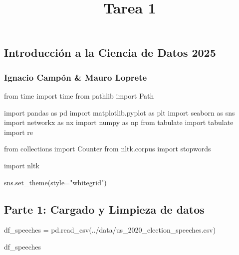 \documentclass[
  letterpaper,
  DIV=11,
  numbers=noendperiod]{scrartcl}
\title{Tarea 1}
\author{}
\date{}
\newenvironment{Shaded}{\begin{snugshade}}{\end{snugshade}}
\newcommand{\ImportTok}[1]{\textcolor[rgb]{0.00,0.46,0.62}{#1}}
\newcommand{\NormalTok}[1]{\textcolor[rgb]{0.00,0.23,0.31}{#1}}
\newcommand{\OperatorTok}[1]{\textcolor[rgb]{0.37,0.37,0.37}{#1}}
\newcommand{\StringTok}[1]{\textcolor[rgb]{0.13,0.47,0.30}{#1}}
\begin{document}
\maketitle


\subsection{Introducción a la Ciencia de Datos
2025}\label{introducciuxf3n-a-la-ciencia-de-datos-2025}

\subsubsection{Ignacio Campón \& Mauro
Loprete}\label{ignacio-campuxf3n-mauro-loprete}

\begin{Shaded}
\begin{Highlighting}[]
\ImportTok{from}\NormalTok{ time }\ImportTok{import}\NormalTok{ time}
\ImportTok{from}\NormalTok{ pathlib }\ImportTok{import}\NormalTok{ Path}

\ImportTok{import}\NormalTok{ pandas }\ImportTok{as}\NormalTok{ pd}
\ImportTok{import}\NormalTok{ matplotlib.pyplot }\ImportTok{as}\NormalTok{ plt}
\ImportTok{import}\NormalTok{ seaborn }\ImportTok{as}\NormalTok{ sns}
\ImportTok{import}\NormalTok{ networkx }\ImportTok{as}\NormalTok{ nx}
\ImportTok{import}\NormalTok{ numpy }\ImportTok{as}\NormalTok{ np}
\ImportTok{from}\NormalTok{ tabulate }\ImportTok{import}\NormalTok{ tabulate}
\ImportTok{import}\NormalTok{ re}

\ImportTok{from}\NormalTok{ collections }\ImportTok{import}\NormalTok{ Counter}
\ImportTok{from}\NormalTok{ nltk.corpus }\ImportTok{import}\NormalTok{ stopwords}

\ImportTok{import}\NormalTok{ nltk}

\NormalTok{sns.set\_theme(style}\OperatorTok{=}\StringTok{"whitegrid"}\NormalTok{)}
\end{Highlighting}
\end{Shaded}

\subsection{Parte 1: Cargado y Limpieza de
datos}\label{parte-1-cargado-y-limpieza-de-datos}

\begin{Shaded}
\begin{Highlighting}[]
\NormalTok{df\_speeches }\OperatorTok{=}\NormalTok{ pd.read\_csv(}\StringTok{\textquotesingle{}../data/us\_2020\_election\_speeches.csv\textquotesingle{}}\NormalTok{)}

\NormalTok{df\_speeches}
\end{Highlighting}
\end{Shaded}
\end{document}
